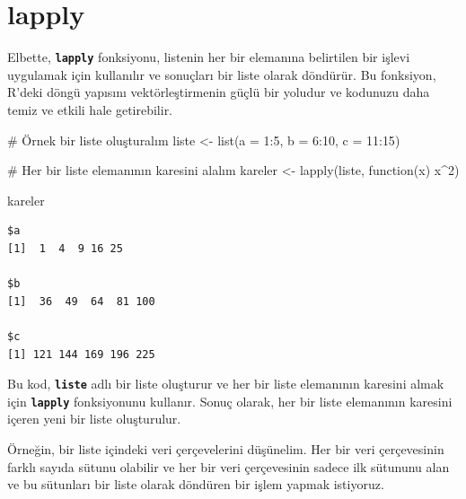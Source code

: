 \documentclass[
  letterpaper,
  DIV=11,
  numbers=noendperiod]{scrreprt}
\newenvironment{Shaded}{\begin{snugshade}}{\end{snugshade}}
\newcommand{\AttributeTok}[1]{\textcolor[rgb]{0.40,0.45,0.13}{#1}}
\newcommand{\CommentTok}[1]{\textcolor[rgb]{0.37,0.37,0.37}{#1}}
\newcommand{\ControlFlowTok}[1]{\textcolor[rgb]{0.00,0.23,0.31}{#1}}
\newcommand{\DecValTok}[1]{\textcolor[rgb]{0.68,0.00,0.00}{#1}}
\newcommand{\FunctionTok}[1]{\textcolor[rgb]{0.28,0.35,0.67}{#1}}
\newcommand{\NormalTok}[1]{\textcolor[rgb]{0.00,0.23,0.31}{#1}}
\newcommand{\OtherTok}[1]{\textcolor[rgb]{0.00,0.23,0.31}{#1}}
\newcommand{\SpecialCharTok}[1]{\textcolor[rgb]{0.37,0.37,0.37}{#1}}
\begin{document}
\section{lapply}\label{lapply}

Elbette, \textbf{\texttt{lapply}} fonksiyonu, listenin her bir elemanına
belirtilen bir işlevi uygulamak için kullanılır ve sonuçları bir liste
olarak döndürür. Bu fonksiyon, R'deki döngü yapısını vektörleştirmenin
güçlü bir yoludur ve kodunuzu daha temiz ve etkili hale getirebilir.

\begin{Shaded}
\begin{Highlighting}[]
\CommentTok{\# Örnek bir liste oluşturalım}
\NormalTok{liste }\OtherTok{\textless{}{-}} \FunctionTok{list}\NormalTok{(}\AttributeTok{a =} \DecValTok{1}\SpecialCharTok{:}\DecValTok{5}\NormalTok{, }\AttributeTok{b =} \DecValTok{6}\SpecialCharTok{:}\DecValTok{10}\NormalTok{, }\AttributeTok{c =} \DecValTok{11}\SpecialCharTok{:}\DecValTok{15}\NormalTok{)}

\CommentTok{\# Her bir liste elemanının karesini alalım}
\NormalTok{kareler }\OtherTok{\textless{}{-}} \FunctionTok{lapply}\NormalTok{(liste, }\ControlFlowTok{function}\NormalTok{(x) x}\SpecialCharTok{\^{}}\DecValTok{2}\NormalTok{)}

\NormalTok{kareler}
\end{Highlighting}
\end{Shaded}

\begin{verbatim}
$a
[1]  1  4  9 16 25

$b
[1]  36  49  64  81 100

$c
[1] 121 144 169 196 225
\end{verbatim}

Bu kod, \textbf{\texttt{liste}} adlı bir liste oluşturur ve her bir
liste elemanının karesini almak için \textbf{\texttt{lapply}}
fonksiyonunu kullanır. Sonuç olarak, her bir liste elemanının karesini
içeren yeni bir liste oluşturulur.

Örneğin, bir liste içindeki veri çerçevelerini düşünelim. Her bir veri
çerçevesinin farklı sayıda sütunu olabilir ve her bir veri çerçevesinin
sadece ilk sütununu alan ve bu sütunları bir liste olarak döndüren bir
işlem yapmak istiyoruz.
\end{document}
